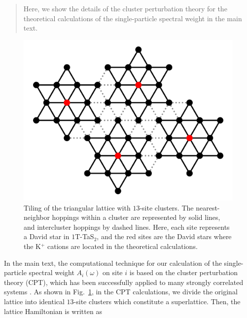\documentclass[aps,prl,reprint,groupedaddress,showpacs,amsfonts,amsmath,amssymb,superscriptaddress]{revtex4-1}
\begin{document}
\date{\today}

\begin{abstract}
Here, we show the details of the cluster perturbation theory for the theoretical calculations of the single-particle spectral weight in the main text.
\end{abstract}

\maketitle

\begin{figure}
  \centering
  \includegraphics[scale=0.28]{fig/cpt-cluster.jpg}
  \caption{\label{cpt-cluster}Tiling of the triangular lattice with $13$-site clusters. The nearest-neighbor hoppings within a cluster are represented by solid lines, and intercluster hoppings by dashed lines. Here, each site represents a David star in $1$T-TaS$_{2}$, and the red sites are the David stars where the K$^{+}$ cations are located in the theoretical calculations.}
\end{figure}
In the main text, the computational technique for our calculation of the single-particle spectral weight $A_{i}(\omega)$ on site $i$ is based on the cluster perturbation theory (CPT), which has been successfully applied to many strongly correlated systems \cite{PhysRevLett.84.522,PhysRevLett.85.2585,PhysRevLett.92.126401,PhysRevLett.107.010401,PhysRevB.84.064520,PhysRevB.90.245102,PhysRevB.98.134410}. As shown in Fig.~\ref{cpt-cluster}, in the CPT calculations, we divide the original lattice into identical $13$-site clusters which constitute a superlattice. Then, the lattice Hamiltonian is written as
\end{document}
